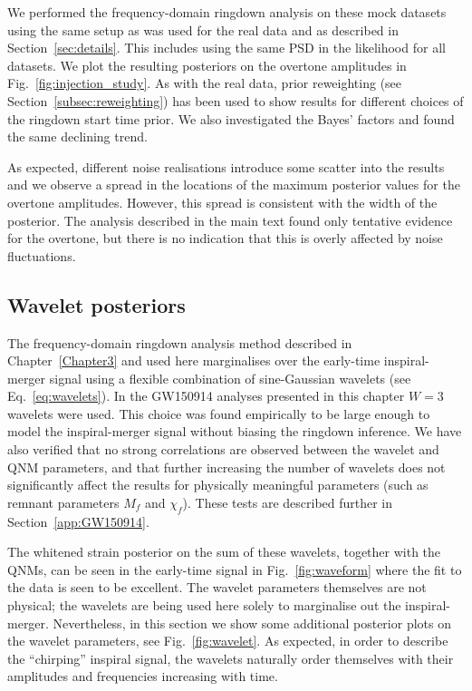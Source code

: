 We performed the frequency-domain ringdown analysis on these mock datasets using the same setup as was used for the real data and as described in Section~\ref{sec:details}.
This includes using the same PSD in the likelihood for all datasets.
We plot the resulting posteriors on the overtone amplitudes in Fig.~\ref{fig:injection_study}.
As with the real data, prior reweighting (see Section~\ref{subsec:reweighting}) has been used to show results for different choices of the ringdown start time prior.
We also investigated the Bayes' factors and found the same declining trend.

As expected, different noise realisations introduce some scatter into the results and we observe a spread in the locations of the maximum posterior values for the overtone amplitudes. 
However, this spread is consistent with the width of the posterior. 
The analysis described in the main text found only tentative evidence for the overtone, but there is no indication that this is overly affected by noise fluctuations.


\subsection{Wavelet posteriors}\label{app:W3}

The frequency-domain ringdown analysis method described in Chapter~\ref{Chapter3} and used here marginalises over the early-time inspiral-merger signal using a flexible combination of sine-Gaussian wavelets (see Eq.~\ref{eq:wavelets}).
In the GW150914 analyses presented in this chapter $W=3$ wavelets were used.
This choice was found empirically to be large enough to model the inspiral-merger signal without biasing the ringdown inference.
We have also verified that no strong correlations are observed between the wavelet and QNM parameters, and that further increasing the number of wavelets does not significantly affect the results for physically meaningful parameters (such as remnant parameters $M_f$ and $\chi_f$). 
These tests are described further in Section~\ref{app:GW150914}.

The whitened strain posterior on the sum of these wavelets, together with the QNMs, can be seen in the early-time signal in Fig.~\ref{fig:waveform} where the fit to the data is seen to be excellent.
The wavelet parameters themselves are not physical; the wavelets are being used here solely to marginalise out the inspiral-merger. 
Nevertheless, in this section we show some additional posterior plots on the wavelet parameters, see Fig.~\ref{fig:wavelet}.
As expected, in order to describe the ``chirping'' inspiral signal, the wavelets naturally order themselves with their amplitudes and frequencies increasing with time. 

